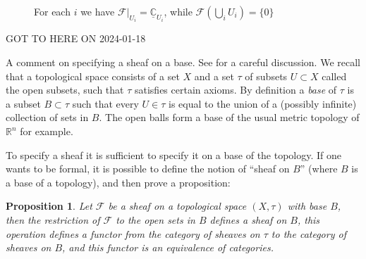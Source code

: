 \documentclass[12pt]{article}
\theoremstyle{plain}
\newtheorem{prop}[thm]{Proposition}
\theoremstyle{definition}
\numberwithin{equation}{section}
\newcommand{\C}{\mathbb{C}}
\newcommand{\R}{\mathbb{R}}
\newcommand{\CF}{\mathcal{F}}
\begin{document}
\begin{figure}[htp]
\begin{center}
\end{center}
\caption{For each $i$ we have $\CF|_{U_i} = \underline{\C}_{U_i}$, while $\CF(\bigcup_i U_i) = \{0\}$}
\label{fig:1}
\end{figure}



{\color{red}GOT TO HERE ON 2024-01-18}

A comment on specifying a sheaf on a base. See {\cite[Section 6.30]{stacks-project}} for a careful discussion.
We recall that a topological space consists of a set $X$ and a set $\tau$ of subsets $U \subset X$ called the open subsets, such that $\tau$ satisfies certain axioms. By definition a \emph{base} of $\tau$ is a subset $B \subset \tau$ such that every $U \in \tau$ is equal to the union of a (possibly infinite) collection of sets in $B$. The open balls form a base of the usual metric topology of $\R^n$ for example.

To specify a sheaf it is sufficient to specify it on a base of the topology. If one wants to be formal, it is possible to define the notion of ``sheaf on $B$'' (where $B$ is a base of a topology), and then prove a proposition:
\begin{prop}
Let $\CF$ be a sheaf on a topological space $(X, \tau)$ with base $B$, then the restriction of $\CF$ to the open sets in $B$ defines a sheaf on $B$, this operation defines a functor from the category of sheaves on $\tau$ to the category of sheaves on $B$, and this functor is an equivalence of categories.
\end{prop}
\end{document}
